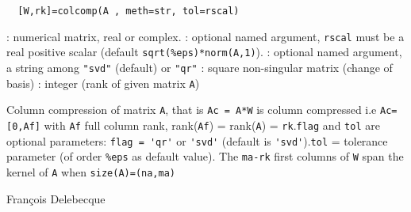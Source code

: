 \begin{calling_sequence}
\begin{verbatim}
  [W,rk]=colcomp(A , meth=str, tol=rscal) 
\end{verbatim}
\end{calling_sequence}
\begin{parameters}
  \begin{varlist}
    : numerical matrix, real or complex.
    : optional named argument, \verb+rscal+ must be  a real positive scalar (default \verb+sqrt(%eps)*norm(A,1)+).
    : optional named argument, a string among \verb+"svd"+ (default) or \verb+"qr"+
    :  square non-singular matrix (change of basis)
    : integer (rank of given matrix \verb!A!)
  \end{varlist}
\end{parameters}
\begin{mandescription}
  Column compression of matrix \verb!A!, that is \verb!Ac = A*W! is 
  column compressed i.e \verb!Ac=[0,Af]! with \verb!Af! full column rank, 
  rank(\verb!Af!) = rank(\verb!A!) = \verb!rk!.\verb!flag! and \verb!tol! are optional parameters: \verb!flag = 'qr'! 
  or \verb!'svd'! (default is \verb!'svd'!).\verb!tol! = tolerance parameter (of order \verb!%eps! as default value).
  The \verb!ma-rk! first columns of \verb!W! span the kernel of \verb!A! 
  when \verb!size(A)=(na,ma)!
\end{mandescription}
\begin{examples}
\end{examples}
\begin{manseealso}
       
\end{manseealso}
\begin{authors}
  Fran\c{c}ois Delebecque
\end{authors}

